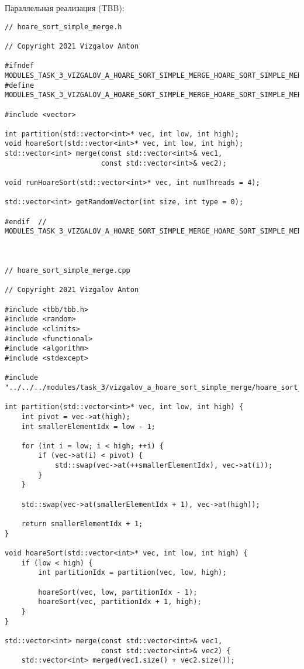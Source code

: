 \documentclass{report}
\begin{document}
\par Параллельная реализация (TBB):
\begin{lstlisting}
// hoare_sort_simple_merge.h

// Copyright 2021 Vizgalov Anton

#ifndef MODULES_TASK_3_VIZGALOV_A_HOARE_SORT_SIMPLE_MERGE_HOARE_SORT_SIMPLE_MERGE_H_
#define MODULES_TASK_3_VIZGALOV_A_HOARE_SORT_SIMPLE_MERGE_HOARE_SORT_SIMPLE_MERGE_H_

#include <vector>

int partition(std::vector<int>* vec, int low, int high);
void hoareSort(std::vector<int>* vec, int low, int high);
std::vector<int> merge(const std::vector<int>& vec1,
                       const std::vector<int>& vec2);

void runHoareSort(std::vector<int>* vec, int numThreads = 4);

std::vector<int> getRandomVector(int size, int type = 0);

#endif  // MODULES_TASK_3_VIZGALOV_A_HOARE_SORT_SIMPLE_MERGE_HOARE_SORT_SIMPLE_MERGE_H_



// hoare_sort_simple_merge.cpp

// Copyright 2021 Vizgalov Anton

#include <tbb/tbb.h>
#include <random>
#include <climits>
#include <functional>
#include <algorithm>
#include <stdexcept>

#include "../../../modules/task_3/vizgalov_a_hoare_sort_simple_merge/hoare_sort_simple_merge.h"

int partition(std::vector<int>* vec, int low, int high) {
    int pivot = vec->at(high);
    int smallerElementIdx = low - 1;

    for (int i = low; i < high; ++i) {
        if (vec->at(i) < pivot) {
            std::swap(vec->at(++smallerElementIdx), vec->at(i));
        }
    }

    std::swap(vec->at(smallerElementIdx + 1), vec->at(high));

    return smallerElementIdx + 1;
}

void hoareSort(std::vector<int>* vec, int low, int high) {
    if (low < high) {
        int partitionIdx = partition(vec, low, high);

        hoareSort(vec, low, partitionIdx - 1);
        hoareSort(vec, partitionIdx + 1, high);
    }
}

std::vector<int> merge(const std::vector<int>& vec1,
                       const std::vector<int>& vec2) {
    std::vector<int> merged(vec1.size() + vec2.size());


\end{lstlisting}
\end{document}
